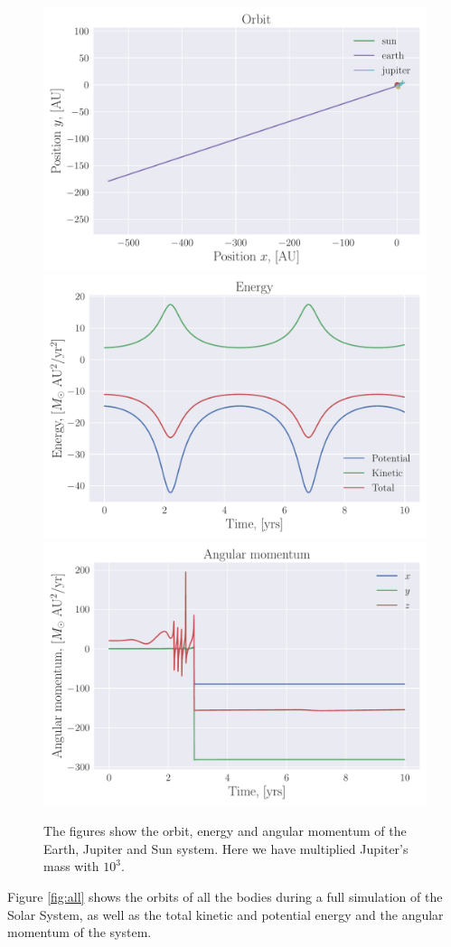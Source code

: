 \documentclass[reprint, english,notitlepage,nofootinbib]{revtex4-1}  %
\begin{document}
\begin{figure}[h]
	\centering
	\includegraphics[width=\linewidth]{../output/three_body1000-verlet-5-6-2.pdf}
	\includegraphics[width=\linewidth]{../output/three_body1000-verlet-5-6-2_energy.pdf}
	\includegraphics[width=\linewidth]{../output/three_body1000-verlet-5-6-2_ang_mom.pdf}
	\caption{The figures show the orbit, energy and angular momentum of the Earth, Jupiter and Sun system. Here we have multiplied Jupiter's mass with $10^3$.}
	\label{fig:three_body1000}
\end{figure}
Figure \ref{fig:all} shows the orbits of all the bodies during a full simulation of the Solar System, as well as the total kinetic and potential energy and the angular momentum of the system.
\end{document}
